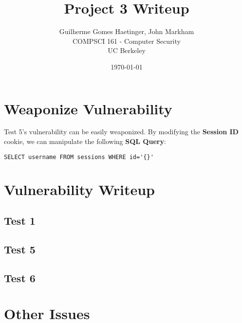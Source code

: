 \documentclass[11pt]{article}
\author{Guilherme Gomes Haetinger, John Markham \\ COMPSCI 161 - Computer Security \\ UC Berkeley}
\date{\today}
\title{\huge Project 3 Writeup}
\begin{document}
\maketitle
\thispagestyle{empty}

\section{Weaponize Vulnerability}
\label{sec:orgaf8e26a}
Test 5's vulnerability can be easily weaponized. By modifying the \textbf{Session ID} cookie, we can manipulate the following \textbf{SQL Query}:

\begin{verbatim}
SELECT username FROM sessions WHERE id='{}'
\end{verbatim}


\section{Vulnerability Writeup}
\label{sec:org23daa6a}

\subsection{Test 1}
\label{sec:orge3ae055}

\subsection{Test 5}
\label{sec:orge9fade6}

\subsection{Test 6}
\label{sec:org510c560}

\section{Other Issues}
\label{sec:org7f57546}
\end{document}
